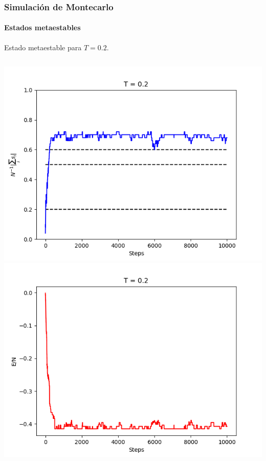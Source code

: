 \documentclass[11pt]{beamer}
\begin{document}
\begin{frame}
\frametitle{Simulación de Montecarlo}
\framesubtitle{Estados metaestables}
Estado metaestable para $T = 0.2$.
\begin{columns}
 \includegraphics[width=\linewidth]{magnet_meta_T=0,2.png}
 \includegraphics[width=\linewidth]{ener_meta_T=0,2.png}
\end{columns}
\end{frame}
\end{document}
